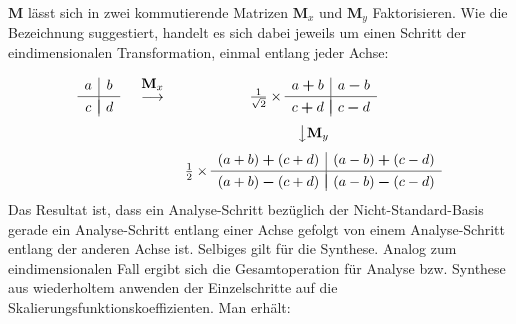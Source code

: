 %
$\mathbf{M}$ lässt sich in zwei kommutierende Matrizen $\mathbf{M}_x$ und $\mathbf{M}_y$ Faktorisieren. Wie die Bezeichnung suggestiert, handelt es sich dabei jeweils um einen Schritt der eindimensionalen Transformation, einmal entlang jeder Achse:
%
\[
\begin{array}{ccc}
\begin{array}{c|c}
a & b \\[.05cm] 
\hline \\[-0.35cm]
c & d
\end{array}
&
\begin{array}{c}
 \\[-0.3cm] \mathbf{M}_x \\[-0.1cm] \longrightarrow \\ \\
\end{array}
&
\frac{1}{\sqrt{2}} \times
\begin{array}{c|c}
a\boldsymbol{+}b & a\boldsymbol{-}b \\[.05cm] 
\hline \\[-0.35cm]
c\boldsymbol{+}d & c\boldsymbol{-}d
\end{array}
\\[.5cm]
 & & \big\downarrow \mathbf{M}_y \\[.25cm]
 & &
\frac{1}{2} \times
\begin{array}{c|c}
(a+b)\boldsymbol{+}(c+d) & (a-b)\boldsymbol{+}(c-d) \\[.05cm] 
\hline \\[-0.35cm]
(a+b)\boldsymbol{-}(c+d) & (a-b)\boldsymbol{-}(c-d)
\end{array}
\\
\end{array}
\]
%
Das Resultat ist, dass ein Analyse-Schritt bezüglich der Nicht-Standard-Basis gerade ein Analyse-Schritt entlang einer Achse gefolgt von einem Analyse-Schritt entlang der anderen Achse ist. Selbiges gilt für die Synthese. Analog zum eindimensionalen Fall ergibt sich die Gesamtoperation für Analyse bzw. Synthese aus wiederholtem anwenden der Einzelschritte auf die Skalierungsfunktionskoeffizienten. Man erhält:

